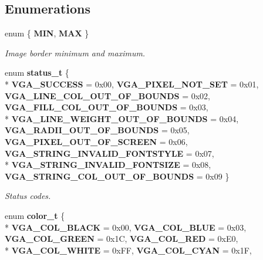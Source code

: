 \subsection*{Enumerations}
\begin{DoxyCompactItemize}
\item 
enum \{ {\bfseries M\+IN}, 
{\bfseries M\+AX}
 \}\label{system_8h_a06fc87d81c62e9abb8790b6e5713c55b}
\begin{DoxyCompactList}\small\item\em Image border minimum and maximum. \end{DoxyCompactList}
\item 
enum {\bf status\+\_\+t} \{ \\*
{\bfseries V\+G\+A\+\_\+\+S\+U\+C\+C\+E\+SS} = 0x00, 
{\bfseries V\+G\+A\+\_\+\+P\+I\+X\+E\+L\+\_\+\+N\+O\+T\+\_\+\+S\+ET} = 0x01, 
{\bfseries V\+G\+A\+\_\+\+L\+I\+N\+E\+\_\+\+C\+O\+L\+\_\+\+O\+U\+T\+\_\+\+O\+F\+\_\+\+B\+O\+U\+N\+DS} = 0x02, 
{\bfseries V\+G\+A\+\_\+\+F\+I\+L\+L\+\_\+\+C\+O\+L\+\_\+\+O\+U\+T\+\_\+\+O\+F\+\_\+\+B\+O\+U\+N\+DS} = 0x03, 
\\*
{\bfseries V\+G\+A\+\_\+\+L\+I\+N\+E\+\_\+\+W\+E\+I\+G\+H\+T\+\_\+\+O\+U\+T\+\_\+\+O\+F\+\_\+\+B\+O\+U\+N\+DS} = 0x04, 
{\bfseries V\+G\+A\+\_\+\+R\+A\+D\+I\+I\+\_\+\+O\+U\+T\+\_\+\+O\+F\+\_\+\+B\+O\+U\+N\+DS} = 0x05, 
{\bfseries V\+G\+A\+\_\+\+P\+I\+X\+E\+L\+\_\+\+O\+U\+T\+\_\+\+O\+F\+\_\+\+S\+C\+R\+E\+EN} = 0x06, 
{\bfseries V\+G\+A\+\_\+\+S\+T\+R\+I\+N\+G\+\_\+\+I\+N\+V\+A\+L\+I\+D\+\_\+\+F\+O\+N\+T\+S\+T\+Y\+LE} = 0x07, 
\\*
{\bfseries V\+G\+A\+\_\+\+S\+T\+R\+I\+N\+G\+\_\+\+I\+N\+V\+A\+L\+I\+D\+\_\+\+F\+O\+N\+T\+S\+I\+ZE} = 0x08, 
{\bfseries V\+G\+A\+\_\+\+S\+T\+R\+I\+N\+G\+\_\+\+C\+O\+L\+\_\+\+O\+U\+T\+\_\+\+O\+F\+\_\+\+B\+O\+U\+N\+DS} = 0x09
 \}\label{system_8h_af9bff8ff1154a04a899276af806b8586}
\begin{DoxyCompactList}\small\item\em Status codes. \end{DoxyCompactList}
\item 
enum {\bf color\+\_\+t} \{ \\*
{\bfseries V\+G\+A\+\_\+\+C\+O\+L\+\_\+\+B\+L\+A\+CK} = 0x00, 
{\bfseries V\+G\+A\+\_\+\+C\+O\+L\+\_\+\+B\+L\+UE} = 0x03, 
{\bfseries V\+G\+A\+\_\+\+C\+O\+L\+\_\+\+G\+R\+E\+EN} = 0x1C, 
{\bfseries V\+G\+A\+\_\+\+C\+O\+L\+\_\+\+R\+ED} = 0x\+E0, 
\\*
{\bfseries V\+G\+A\+\_\+\+C\+O\+L\+\_\+\+W\+H\+I\+TE} = 0x\+FF, 
{\bfseries V\+G\+A\+\_\+\+C\+O\+L\+\_\+\+C\+Y\+AN} = 0x1F, 

\end{DoxyCompactItemize}
